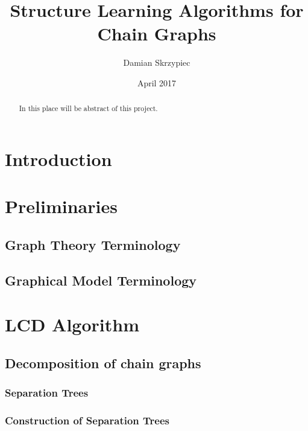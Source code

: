 \documentclass{pracamgr}
\author{Damian Skrzypiec}
\title{Structure Learning Algorithms for Chain Graphs}
\date{April 2017}
\theoremstyle{definition}
\begin{document}
\maketitle

\begin{abstract}
  In this place will be abstract of this project.
\end{abstract}

\tableofcontents
\listoffigures
\listofalgorithms
{}

\chapter{Introduction}




\chapter{Preliminaries}\label{r:prelim}

	\section{Graph Theory Terminology}\label{r:defGraph}
		
		
	\section{Graphical Model Terminology}\label{r:defGraphModel}
		


\chapter{LCD Algorithm} \label{chap:LCDAlg}

	

	\section{Decomposition of chain graphs}
		
		\subsection{Separation Trees}
			
			
		\subsection{Construction of Separation Trees}
						
			
\end{document}
